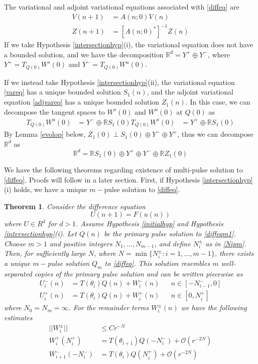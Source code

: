 \documentclass[12pt]{article}
\def\R{{\mathbb R}}
\newtheorem{theorem}{Theorem}
\begin{document}
The variational and adjoint variational equations associated with \eqref{diffeq} are
\begin{align}
V(n+1) &= A(n; 0) V(n) \label{vareq} \\
Z(n+1) &= [A(n; 0)^*]^{-1} Z(n) \label{adjvareq} 
\end{align}
If we take Hypothesis \ref{intersectionhyp}(i), the variational equation does not have a bounded solution, and we have the decomposition $\R^d = Y^+ \oplus Y^-$, where $Y^+ = T_{Q(0)} W^s(0)$ and $Y^- = T_{Q(0)} W^u(0)$.

If we instead take Hypothesis \ref{intersectionhyp}(ii), the variational equation \eqref{vareq} has a unique bounded solution $S_1(n)$, and the adjoint variational equation \eqref{adjvareq} has a unique bounded solution $Z_1(n)$. In this case, we can decompose the tangent spaces to $W^s(0)$ and $W^u(0)$ at $Q(0)$ as
\begin{align*}
T_{Q(0)} W^u(0) &= Y^- \oplus \R S_1(0)
T_{Q(0)} W^s(0) &= Y^+ \oplus \R S_1(0)
\end{align*}
By Lemma \ref{evolop} below, $Z_1(0) \perp S_1(0) \oplus Y^- \oplus Y^+$, thus we can decompose $\R^d$ as
\begin{equation}\label{nontdecomp}
\R^d = \R S_1(0) \oplus Y^+ \oplus Y^- \oplus \R Z_1(0)
\end{equation}

We have the following theorems regarding existence of multi-pulse solution to \eqref{diffeq}. Proofs will follow in a later section. First, if Hypothesis \ref{intersectionhyp}(i) holds, we have a unique $m-$pulse solution to \eqref{diffeq}.

\begin{theorem}\label{transversemulti}
Consider the difference equation
\begin{equation}\label{diffeqm1}
U(n+1) = F(u(n))
\end{equation}
where $U \in R^d$ for $d > 1$. Assume Hypothesis \ref{initialhyp} and Hypothesis \ref{intersectionhyp}(i). Let $Q(n)$ be the primary pulse solution to \eqref{diffeqm1}. Choose $m > 1$ and positive integers $N_1, \dots, N_{m-1}$, and define $N_i^\pm$ as in \eqref{Nipm}. Then, for sufficiently large $N$, where $N = \min\{ N_i^\pm : i = 1, \dots, m-1 \}$, there exists a unique $m-$pulse solution $Q_m$ to \eqref{diffeq}. This solution resembles $m$ well-separated copies of the primary pulse solution and can be written piecewise as 
\begin{align}
U_i^-(n) &= T(\theta_i) Q(n) + W_i^-(n) && n \in [-N_{i-1}^-, 0] \\
U_i^+(n) &= T(\theta_i) Q(n) + W_i^+(n) && n \in [0, N_i^+]
\end{align}
where $N_0 = N_m = \infty$. For the remainder terms $W_i^\pm(n)$ we have the following estimates
\begin{align}
||W_i^\pm|| &\leq C r^{-N} \\
W_i^+(N_i^+) &= T(\theta_{i+1}) Q(-N_i^-) + \mathcal{O}(r^{-2N}) \\
W_{i+1}^-(-N_i^-) &= T(\theta_i) Q(N_i^+) + \mathcal{O}(r^{-2N})
\end{align}
\end{theorem}
\end{document}
